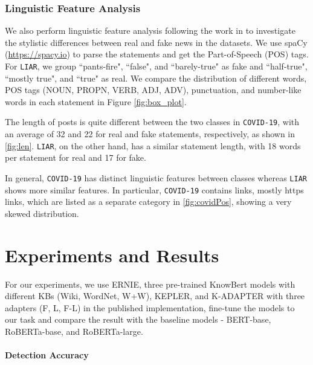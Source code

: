\documentclass[letterpaper]{article} %
\begin{document}
\subsubsection{Linguistic Feature Analysis}
We also perform linguistic feature analysis following the work in
\citet{Horne_Adali_2017} to investigate the stylistic differences between real and fake news in the datasets.
We use spaCy (\url{https://spacy.io}) to parse the statements and get the Part-of-Speech (POS) tags.
For \texttt{LIAR}, we group ``pants-fire", ``false", and ``barely-true" as fake and ``half-true", ``mostly true", and ``true" as real.
We compare the distribution of different words, POS tags (NOUN, PROPN, VERB, ADJ, ADV), punctuation, and number-like words in each statement in Figure \ref{fig:box_plot}.

The length of posts is quite different between the two classes in \texttt{COVID-19}, with an average of 32 and 22 for real and fake statements, respectively, as shown in
\autoref{fig:len}.
\texttt{LIAR}, on the other hand, has a similar statement length, with 18 words per statement for real and 17 for fake.

In general, \texttt{COVID-19} has distinct linguistic features between classes whereas \texttt{LIAR} shows more similar features.
In particular, \texttt{COVID-19} contains links, mostly https links, which are listed as a separate category in \autoref{fig:covidPos}, showing a very skewed distribution.


\section{Experiments and Results}

For our experiments, we use ERNIE, three pre-trained KnowBert models with different KBs (Wiki, WordNet, W+W), KEPLER, and K-ADAPTER with three adapters (F, L, F-L) in the published implementation, fine-tune the models to our task and compare the result with the baseline models - BERT-base, RoBERTa-base, and RoBERTa-large.


\paragraph{Detection Accuracy}
\end{document}
